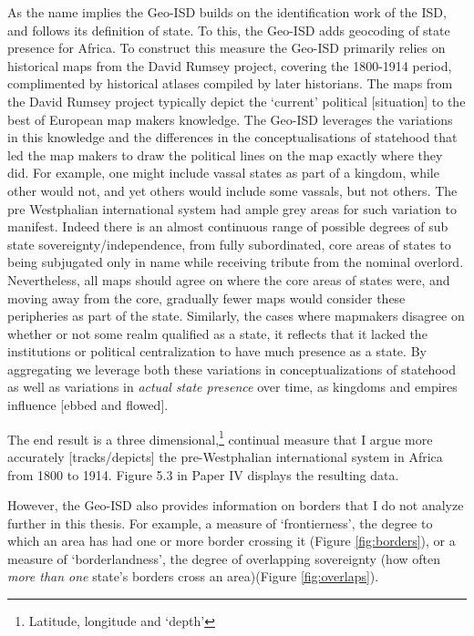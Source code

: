 As the name implies the Geo-ISD builds on the identification work of the ISD,
and follows its definition of state. To this, the Geo-ISD adds geocoding of
state presence for Africa. To construct this measure the Geo-ISD primarily
relies on historical maps from the David Rumsey project, covering the 1800-1914
period, complimented by historical atlases compiled by later historians. The
maps from the David Rumsey project typically depict the `current' political
[situation] to the best of European map makers knowledge. The Geo-ISD leverages
the variations in this knowledge and the differences in the conceptualisations
of statehood that led the map makers to draw the political lines on the map
exactly where they did. For example, one might include vassal states as part of
a kingdom, while other would not, and yet others would include some vassals, but
not others. The pre Westphalian international system had ample grey areas for
such variation to manifest. Indeed there is an almost continuous range of
possible degrees of sub state sovereignty/independence, from fully subordinated,
core areas of states to being subjugated only in name while receiving tribute
from the nominal overlord. Nevertheless, all maps should agree on where the core
areas of states were, and moving away from the core, gradually fewer maps would
consider these peripheries as part of the state. Similarly, the cases where
mapmakers disagree on whether or not some realm qualified as a state, it
reflects that it lacked the institutions or political centralization to have
much presence as a state. By aggregating we leverage both these variations in
conceptualizations of statehood as well as variations in \textit{actual state
presence} over time, as kingdoms and empires influence [ebbed and flowed].

The end result is a three dimensional,\footnote{Latitude, longitude and `depth'}
continual measure that I argue more accurately [tracks/depicts] the
pre-Westphalian international system in Africa from 1800 to 1914. Figure 5.3 in
Paper IV displays the resulting data. 

However, the Geo-ISD also provides information on borders that I do not analyze
further in this thesis. For example, a measure of `frontierness', the degree to
which an area has had one or more border crossing it (Figure \ref{fig:borders}),
or a measure of `borderlandness', the degree of overlapping sovereignty (how
often \textit{more than one} state's borders cross an area)(Figure
\ref{fig:overlaps}). 

